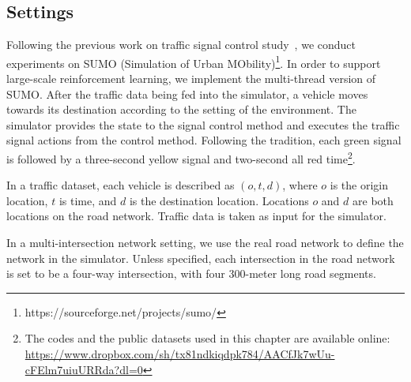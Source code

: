 \subsection{Settings}
Following the previous work on traffic signal control study~\cite{wei2018intellilight}, we conduct experiments on SUMO (Simulation of Urban MObility)\footnote{https://sourceforge.net/projects/sumo/}. In order to support large-scale reinforcement learning, we implement the multi-thread version of SUMO. After the traffic data being fed into the simulator, a vehicle moves towards its destination according to the setting of the environment. The simulator provides the state to the signal control method and executes the traffic signal actions from the control method. Following the tradition, each green signal is followed by a three-second yellow signal and two-second all red time\footnote{The codes and the public datasets used in this chapter are available online: \url{https://www.dropbox.com/sh/tx81ndkiqdpk784/AACfJk7wUu-cFElm7uiuURRda?dl=0}}. 

In a traffic dataset, each vehicle is described as $(o, t, d)$, where $o$ is the origin location, $t$ is  time, and $d$ is the destination location. Locations $o$ and $d$ are both locations on the road network. Traffic data is taken as input for the simulator.

In a multi-intersection network setting, we use the real road network to define the network in the simulator. Unless specified, each intersection in the road network is set to be a four-way intersection, with four 300-meter long road segments. 

